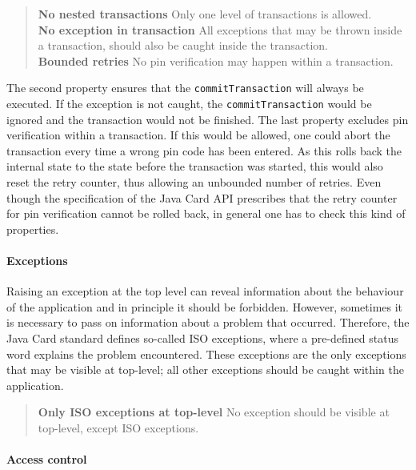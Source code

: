 \begin{quote}
\textbf{No nested transactions} Only one level of transactions
is allowed.\smallskip\\
\textbf{No exception in transaction} All exceptions that may be thrown
inside a transaction, should also be caught inside the
transaction.\smallskip\\
\textbf{Bounded retries}
No pin verification may happen within a transaction.
\end{quote} 
The second property ensures that the \texttt{commitTransaction} will
always be executed. If the exception is not caught, the
\texttt{commitTransaction} would be ignored and the transaction would
not be finished. The last property excludes pin verification within a
transaction. If this would be allowed, one could abort the transaction
every time a wrong pin code has been entered. As this rolls
back the internal state to the state before the transaction was
started, this would also reset the retry counter, thus allowing an
unbounded number of retries. Even though the specification of the Java
Card API prescribes that the retry counter for pin verification cannot
be rolled back, in general one has to check this kind of properties.

\paragraph{Exceptions}

Raising an exception at the top level can reveal
information about the behaviour of the application and in principle it
should be forbidden. However, sometimes it is necessary to pass on
information about a problem that occurred. Therefore, the Java
Card standard defines so-called ISO exceptions, where a pre-defined
status word explains the problem encountered. These exceptions are the
only exceptions that may be visible at top-level; all other exceptions
should be caught within the application.

\begin{quote}
\textbf{Only ISO exceptions at top-level}
No exception should be visible at top-level, except ISO
exceptions.
\end{quote}

\paragraph {Access control} 

